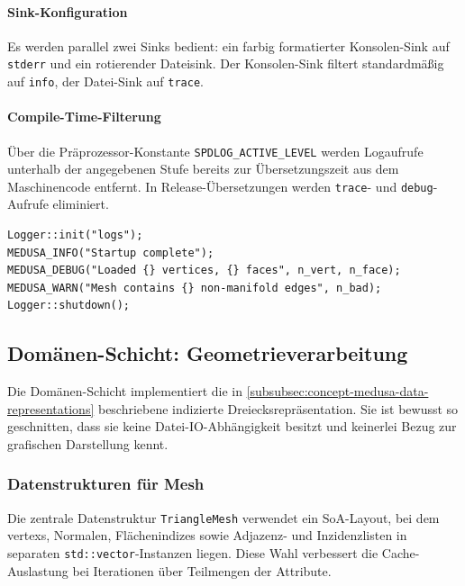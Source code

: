                 \paragraph{Sink-Konfiguration}\label{para:impl-medusa-logger-sinks}
                    Es werden parallel zwei Sinks bedient: ein farbig formatierter Konsolen-Sink auf \texttt{stderr} und ein rotierender Dateisink.
                    Der Konsolen-Sink filtert standardmäßig auf \texttt{info}, der Datei-Sink auf \texttt{trace}.

                \paragraph{Compile-Time-Filterung}\label{para:impl-medusa-logger-compile-time}
                    Über die Präprozessor-Konstante \texttt{SPDLOG\_ACTIVE\_LEVEL} werden Logaufrufe unterhalb der angegebenen Stufe bereits zur Übersetzungszeit aus dem Maschinencode entfernt.
                    In Release-Übersetzungen werden \texttt{trace}- und \texttt{debug}-Aufrufe eliminiert.

                    \begin{lstlisting}[style=cppStyle, caption={Verwendung der Logger-Makros.}, label={lst:impl-medusa-logger-macros}]
Logger::init("logs");
MEDUSA_INFO("Startup complete");
MEDUSA_DEBUG("Loaded {} vertices, {} faces", n_vert, n_face);
MEDUSA_WARN("Mesh contains {} non-manifold edges", n_bad);
Logger::shutdown();
                    \end{lstlisting}

        \subsection{Domänen-Schicht: Geometrieverarbeitung}\label{subsec:impl-medusa-geometry}
            Die Domänen-Schicht implementiert die in \cref{subsubsec:concept-medusa-data-representations} beschriebene indizierte Dreiecksrepräsentation.
            Sie ist bewusst so geschnitten, dass sie keine Datei-IO-Abhängigkeit besitzt und keinerlei Bezug zur grafischen Darstellung kennt.

            \subsubsection{Datenstrukturen für Mesh}\label{subsubsec:impl-medusa-mesh-data-structures}
                Die zentrale Datenstruktur \texttt{TriangleMesh} verwendet ein \ac{SoA}-Layout, bei dem \glspl{vertex}, Normalen, Flächenindizes sowie Adjazenz- und Inzidenzlisten in separaten \texttt{std::vector}-Instanzen liegen.
                Diese Wahl verbessert die Cache-Auslastung bei Iterationen über Teilmengen der Attribute.

